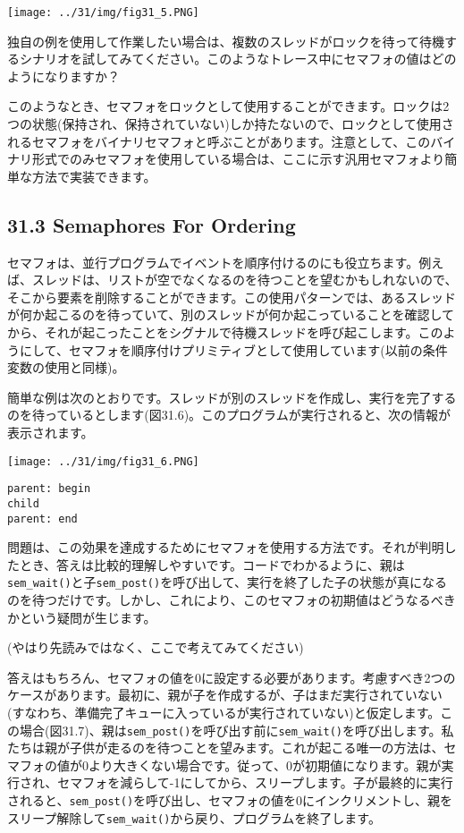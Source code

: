 \texttt{[image: ../31/img/fig31\_5.PNG]}

独自の例を使用して作業したい場合は、複数のスレッドがロックを待って待機するシナリオを試してみてください。このようなトレース中にセマフォの値はどのようになりますか？

このようなとき、セマフォをロックとして使用することができます。ロックは2つの状態(保持され、保持されていない)しか持たないので、ロックとして使用されるセマフォをバイナリセマフォと呼ぶことがあります。注意として、このバイナリ形式でのみセマフォを使用している場合は、ここに示す汎用セマフォより簡単な方法で実装できます。

\hypertarget{semaphores-for-ordering}{%
\subsection*{31.3 Semaphores For
Ordering}\label{semaphores-for-ordering}}

セマフォは、並行プログラムでイベントを順序付けるのにも役立ちます。例えば、スレッドは、リストが空でなくなるのを待つことを望むかもしれないので、そこから要素を削除することができます。この使用パターンでは、あるスレッドが何か起こるのを待っていて、別のスレッドが何か起こっていることを確認してから、それが起こったことをシグナルで待機スレッドを呼び起こします。このようにして、セマフォを順序付けプリミティブとして使用しています(以前の条件変数の使用と同様)。

簡単な例は次のとおりです。スレッドが別のスレッドを作成し、実行を完了するのを待っているとします(図31.6)。このプログラムが実行されると、次の情報が表示されます。

\texttt{[image: ../31/img/fig31\_6.PNG]}

\begin{verbatim}
parent: begin
child
parent: end
\end{verbatim}

問題は、この効果を達成するためにセマフォを使用する方法です。それが判明したとき、答えは比較的理解しやすいです。コードでわかるように、親は\texttt{sem\_wait()}と子\texttt{sem\_post()}を呼び出して、実行を終了した子の状態が真になるのを待つだけです。しかし、これにより、このセマフォの初期値はどうなるべきかという疑問が生じます。

(やはり先読みではなく、ここで考えてみてください)

答えはもちろん、セマフォの値を0に設定する必要があります。考慮すべき2つのケースがあります。最初に、親が子を作成するが、子はまだ実行されていない(すなわち、準備完了キューに入っているが実行されていない)と仮定します。この場合(図31.7)、親は\texttt{sem\_post()}を呼び出す前に\texttt{sem\_wait()}を呼び出します。私たちは親が子供が走るのを待つことを望みます。これが起こる唯一の方法は、セマフォの値が0より大きくない場合です。従って、0が初期値になります。親が実行され、セマフォを減らして-1にしてから、スリープします。子が最終的に実行されると、\texttt{sem\_post()}を呼び出し、セマフォの値を0にインクリメントし、親をスリープ解除して\texttt{sem\_wait()}から戻り、プログラムを終了します。

